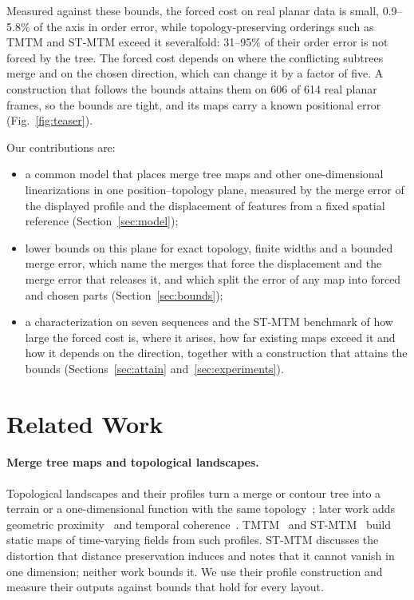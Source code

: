 \documentclass[review]{vgtc}
\begin{document}
Measured against these bounds, the forced cost on real planar data is small, 0.9--5.8\% of the axis in order error, while topology-preserving orderings such as TMTM and ST-MTM exceed it severalfold: 31--95\% of their order error is not forced by the tree. The forced cost depends on where the conflicting subtrees merge and on the chosen direction, which can change it by a factor of five. A construction that follows the bounds attains them on 606 of 614 real planar frames, so the bounds are tight, and its maps carry a known positional error (Fig.~\ref{fig:teaser}).

Our contributions are:
\begin{itemize}
\setlength{\itemsep}{2pt}
\setlength{\parsep}{0pt}
\item a common model that places merge tree maps and other one-dimensional linearizations in one position--topology plane, measured by the merge error of the displayed profile and the displacement of features from a fixed spatial reference (Section~\ref{sec:model});
\item lower bounds on this plane for exact topology, finite widths and a bounded merge error, which name the merges that force the displacement and the merge error that releases it, and which split the error of any map into forced and chosen parts (Section~\ref{sec:bounds});
\item a characterization on seven sequences and the ST-MTM benchmark of how large the forced cost is, where it arises, how far existing maps exceed it and how it depends on the direction, together with a construction that attains the bounds (Sections~\ref{sec:attain} and~\ref{sec:experiments}).
\end{itemize}

\section{Related Work}\label{sec:related}
\paragraph{Merge tree maps and topological landscapes.} Topological landscapes and their profiles turn a merge or contour tree into a terrain or a one-dimensional function with the same topology~\cite{Weber:2007:TL,Oesterling:2013:TLP}; later work adds geometric proximity~\cite{Beketayev:2012:GPTL} and temporal coherence~\cite{Herick:2020:TCTL}. TMTM~\cite{Koepp:2023:TMTM} and ST-MTM~\cite{STMTM:2026} build static maps of time-varying fields from such profiles. ST-MTM discusses the distortion that distance preservation induces and notes that it cannot vanish in one dimension; neither work bounds it. We use their profile construction and measure their outputs against bounds that hold for every layout.
\end{document}
